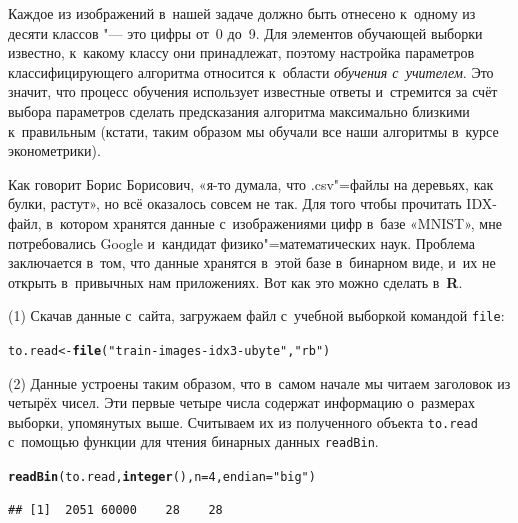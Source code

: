 \documentclass[final,pdftex]{../../template/epsilonj}\usepackage[]{graphicx}\usepackage[]{color}
\makeatletter
\newcommand{\hlnum}[1]{\textcolor[rgb]{0.686,0.059,0.569}{#1}}%
\newcommand{\hlstr}[1]{\textcolor[rgb]{0.192,0.494,0.8}{#1}}%
\newcommand{\hlstd}[1]{\textcolor[rgb]{0.345,0.345,0.345}{#1}}%
\newcommand{\hlkwb}[1]{\textcolor[rgb]{0.69,0.353,0.396}{#1}}%
\newcommand{\hlkwc}[1]{\textcolor[rgb]{0.333,0.667,0.333}{#1}}%
\newcommand{\hlkwd}[1]{\textcolor[rgb]{0.737,0.353,0.396}{\textbf{#1}}}%
\newenvironment{kframe}{%
 \def\at@end@of@kframe{}%
 \ifinner\ifhmode%
  \def\at@end@of@kframe{\end{minipage}}%
  \begin{minipage}{\columnwidth}%
 \fi\fi%
 \def\FrameCommand##1{\hskip\@totalleftmargin \hskip-\fboxsep
 \colorbox{shadecolor}{##1}\hskip-\fboxsep
     \hskip-\linewidth \hskip-\@totalleftmargin \hskip\columnwidth}%
 \MakeFramed {\advance\hsize-\width
   \@totalleftmargin\z@ \linewidth\hsize
   \@setminipage}}%
 {\par\unskip\endMakeFramed%
 \at@end@of@kframe}
\newenvironment{knitrout}{}{} %
\makeatother
\begin{document}
Каждое из изображений в~нашей задаче должно быть отнесено к~одному из десяти классов "--- это цифры от~0 до~9. 
Для элементов обучающей выборки известно, к~какому классу они принадлежат, поэтому настройка параметров классифицирующего алгоритма относится к~области \textit{обучения с~учителем}. 
Это значит, что процесс обучения использует известные ответы и~стремится за счёт выбора параметров сделать предсказания алгоритма максимально близкими к~правильным (кстати, таким образом мы обучали все наши алгоритмы в~курсе эконометрики).

Как говорит Борис Борисович, «я-то думала, что .csv"=файлы на деревьях, как булки, растут», но всё оказалось совсем не так. 
Для того чтобы прочитать IDX-файл, в~котором хранятся данные с~изображениями цифр в~базе «MNIST», мне потребовались Google и~кандидат физико"=математических наук. 
Проблема заключается в~том, что данные хранятся в~этой базе в~бинарном виде, и~их не открыть в~привычных нам приложениях.
Вот как это можно сделать в~\textbf{R}.

\par\medskip
(1) Скачав данные с~сайта, загружаем файл с~учебной выборкой командой \texttt{file}:

\begin{knitrout}
\color{fgcolor}\begin{kframe}
\begin{alltt}
\hlstd{to.read} \hlkwb{<-} \hlkwd{file}\hlstd{(}\hlstr{"train-images-idx3-ubyte"}\hlstd{,} \hlstr{"rb"}\hlstd{)}
\end{alltt}
\end{kframe}
\end{knitrout}

\par\medskip (2) Данные устроены таким образом, что в~самом начале мы читаем заголовок из четырёх чисел. Эти первые четыре числа содержат информацию о~размерах выборки, упомянутых выше. Считываем их из полученного объекта \texttt{to.read} с~помощью функции для чтения бинарных данных \texttt{readBin}.

\begin{knitrout}
\color{fgcolor}\begin{kframe}
\begin{alltt}
\hlkwd{readBin}\hlstd{(to.read,} \hlkwd{integer}\hlstd{(),} \hlkwc{n} \hlstd{=} \hlnum{4}\hlstd{,} \hlkwc{endian}\hlstd{=}\hlstr{"big"}\hlstd{)}
\end{alltt}
\begin{verbatim}
## [1]  2051 60000    28    28
\end{verbatim}
\end{kframe}
\end{knitrout}
\end{document}
